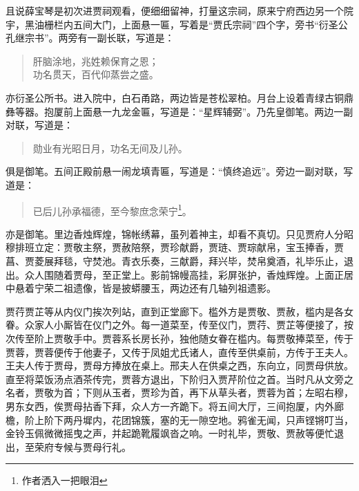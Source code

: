 \documentclass[12pt,oneside]{book}
\newenvironment{shici}{%
\begin{verse}%
\centering\large\hspace{12pt}}%
{\end{verse}}
\begin{document}
且说薛宝琴是初次进贾祠观看，便细细留神，打量这宗祠，原来宁府西边另一个院宇，黑油栅栏内五间大门，上面悬一匾，写着是“贾氏宗祠”四个字，旁书“衍圣公孔继宗书”。两旁有一副长联，写道是：

\begin{shici}
肝脑涂地，兆姓赖保育之恩；\\
功名贯天，百代仰蒸尝之盛。
\end{shici}


亦衍圣公所书。进入院中，白石甬路，两边皆是苍松翠柏。月台上设着青绿古铜鼎彝等器。抱厦前上面悬一九龙金匾，写道是：“星辉辅弼”。乃先皇御笔。两边一副对联，写道是：

\begin{shici}
勋业有光昭日月，功名无间及儿孙。
\end{shici}

俱是御笔。五间正殿前悬一闹龙填青匾，写道是：“慎终追远”。旁边一副对联，写道是：

\begin{shici}
已后儿孙承福德，至今黎庶念荣宁\footnote{作者洒入一把眼泪}。
\end{shici}


亦是御笔。里边香烛辉煌，锦帐绣幕，虽列着神主，却看不真切。只见贾府人分昭穆排班立定：贾敬主祭，贾赦陪祭，贾珍献爵，贾琏、贾琮献帛，宝玉捧香，贾菖、贾菱展拜毯，守焚池。青衣乐奏，三献爵，拜兴毕，焚帛奠酒，礼毕乐止，退出。众人围随着贾母，至正堂上。影前锦幔高挂，彩屏张护，香烛辉煌。上面正居中悬着宁荣二祖遗像，皆是披蟒腰玉，两边还有几轴列祖遗影。

贾荇贾芷等从内仪门挨次列站，直到正堂廊下。槛外方是贾敬、贾赦，槛内是各女眷。众家人小厮皆在仪门之外。每一道菜至，传至仪门，贾荇、贾芷等便接了，按次传至阶上贾敬手中。贾蓉系长房长孙，独他随女眷在槛内。每贾敬捧菜至，传于贾蓉，贾蓉便传于他妻子，又传于凤姐尤氏诸人，直传至供桌前，方传于王夫人。王夫人传于贾母，贾母方捧放在桌上。邢夫人在供桌之西，东向立，同贾母供放。直至将菜饭汤点酒茶传完，贾蓉方退出，下阶归入贾芹阶位之首。当时凡从文旁之名者，贾敬为首；下则从玉者，贾珍为首，再下从草头者，贾蓉为首；左昭右穆，男东女西，俟贾母拈香下拜，众人方一齐跪下。将五间大厅，三间抱厦，内外廊檐，阶上阶下两丹墀内，花团锦簇，塞的无一隙空地。鸦雀无闻，只声铿锵叮当，金铃玉佩微微摇曳之声，并起跪靴履飒沓之响。一时礼毕，贾敬、贾赦等便忙退出，至荣府专候与贾母行礼。
\end{document}
